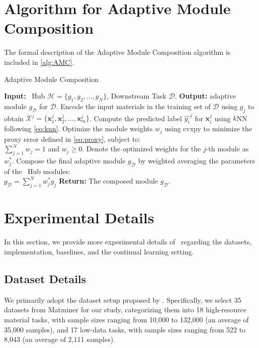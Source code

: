 \section{Algorithm for Adaptive Module Composition}

The formal description of the Adaptive Module Composition algorithm is included in \cref{alg:AMC}.

\begin{algorithm}
\caption{Adaptive Module Composition}
\label{alg:AMC}
\begin{algorithmic}[1]
\STATE \textbf{Input:} \name \ Hub $\mathcal{H} = \{g_1, g_2, \dots, g_{N}\}$, Downstream Task $\mathcal{D}$.
\STATE \textbf{Output:} adaptive module $g_{\mathcal{D}}$ for $\mathcal{D}$.
    \STATE Encode the input materials in the training set of $\mathcal{D}$ using $g_j$ to obtain $\mathcal{X}^j = \{\mathbf{x}_1^j, \mathbf{x}_2^j, \ldots, \mathbf{x}_m^j\}$.
        \STATE Compute the predicted label $\hat{y_i}^j$ for $\mathbf{x}_i^j$ using $k$NN following \cref{eq:knn}.
    \ENDFOR
\ENDFOR
\STATE Optimize the module weights $w_j$ using cvxpy to minimize the proxy error defined in \cref{eq:proxy}, subject to: \\ $\sum_{j=1}^{N} w_j = 1$ and $w_j \geq 0$. Denote the optimized weights for the $j$-th module as $w_j^{*}$.
\STATE Compose the final adaptive module $g_\mathcal{D}$ by weighted averaging the parameters of the \name \ Hub modules: \\
    $g_\mathcal{D} = \sum_{j=1}^N w_j^{*} g_j$
\STATE \textbf{Return:} The composed module $g_{\mathcal{D}}$.
\end{algorithmic}
\end{algorithm}



\section{Experimental Details}
In this section, we provide more experimental details of \name \ regarding the datasets, implementation, baselines, and the continual learning setting.

\subsection{Dataset Details}



\label{appendix:data}
We primarily adopt the dataset setup proposed by \citet{chang2022towards}. Specifically, we select 35 datasets from Matminer \citep{ward2018matminer} for our study, categorizing them into 18 high-resource material tasks, with sample sizes ranging from 10,000 to 132,000 (an average of 35,000 samples), and 17 low-data tasks, with sample sizes ranging from 522 to 8,043 (an average of 2,111 samples).

